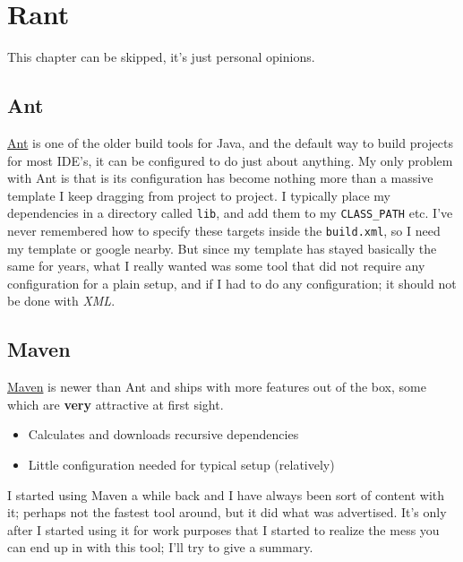 
\section{ Rant }

This chapter can be skipped, it's just personal opinions.



\subsection{ Ant }

 \href{http://ant.apache.org}{Ant} is one of the older build tools for Java, and
the default way to build projects for most IDE's, it can be configured to
do just about anything. My only problem with Ant is that is its
configuration has become nothing more than a massive template I keep
dragging from project to project.  I typically place my dependencies in a
directory called \texttt{lib}, and add them to my \texttt{CLASS\_PATH} etc.  I've never
remembered how to specify these targets inside the \texttt{build.xml}, so I need
my template or google nearby.  But since my template has stayed basically
the same for years, what I really wanted was some tool that did not require
any configuration for a plain setup, and if I had to do any
configuration; it should not be done with \textit{XML}.




\subsection{ Maven }

 \href{http://maven.apache.org}{Maven} is newer than Ant and ships with more
features out of the box, some which are \textbf{very} attractive at first sight.

\begin{itemize}

\item{ Calculates and downloads recursive dependencies}

\item{ Little configuration needed for typical setup (relatively)}

\end{itemize}


I started using Maven a while back and I have always been sort of content
with it; perhaps not the fastest tool around, but it did what was advertised.
It's only after I started using it for work purposes that I
started to realize the mess you can end up in with this tool; I'll try
to give a summary.



